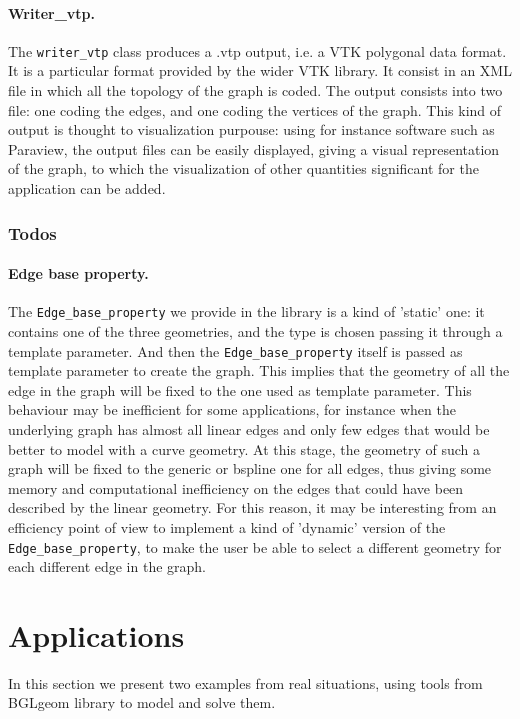 \documentclass[11pt]{article} %
\newcommand{\classname}[1]{\texttt{#1}}
\begin{document}
		\paragraph{Writer\_vtp.} The \texttt{writer\_vtp} class produces a .vtp output, i.e. a VTK polygonal data format. It is a particular format provided by the wider VTK library. It consist in an XML file in which all the topology of the graph is coded. The output consists into two file: one coding the edges, and one coding the vertices of the graph. This kind of output is thought to visualization purpouse: using for instance software such as Paraview, the output files can be easily displayed, giving a visual representation of the graph, to which the visualization of other quantities significant for the application can be added.
	
		\subsubsection{Todos}
		\paragraph{Edge base property.} The \classname{Edge\_base\_property} we provide in the library is a kind of 'static' one: it contains one of the three geometries, and the type is chosen passing it through a template parameter. And then the \classname{Edge\_base\_property} itself is passed as template parameter to create the graph. This implies that the geometry of all the edge in the graph will be fixed to the one used as template parameter. This behaviour may be inefficient for some applications, for instance when the underlying graph has almost all linear edges and only few edges that would be better to model with a curve geometry. At this stage, the geometry of such a graph will be fixed to the generic or bspline one for all edges, thus giving some memory and computational inefficiency on the edges that could have been described by the linear geometry. For this reason, it may be interesting from an efficiency point of view to implement a kind of 'dynamic' version of the \classname{Edge\_base\_property}, to make the user be able to select a different geometry for each different edge in the graph.

\section{Applications}
	In this section we present two examples from real situations, using tools from BGLgeom library to model and solve them.
\end{document}

